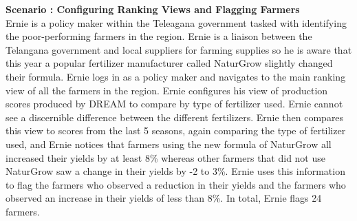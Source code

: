 
\begin{flushleft}
\textbf{Scenario : Configuring Ranking Views and Flagging Farmers}\\\smallskip
Ernie is a policy maker within the Teleagana government tasked with identifying the poor-performing farmers in the region. Ernie is a liaison between the Telangana government and local suppliers for farming supplies so he is aware that this year a popular fertilizer manufacturer called NaturGrow slightly changed their formula. Ernie logs in as a policy maker and navigates to the main ranking view of all the farmers in the region. Ernie configures his view of production scores produced by DREAM to compare by type of fertilizer used. Ernie cannot see a discernible difference between the different fertilizers. Ernie then compares this view to scores from the last 5 seasons, again comparing the type of fertilizer used, and Ernie notices that farmers using the new formula of NaturGrow all increased their yields by at least 8\% whereas other farmers that did not use NaturGrow saw a change in their yields by -2 to 3\%. Ernie uses this information to flag the farmers who observed a reduction in their yields and the farmers who observed an increase in their yields of less than 8\%. In total, Ernie flags 24 farmers. 
\end{flushleft}
